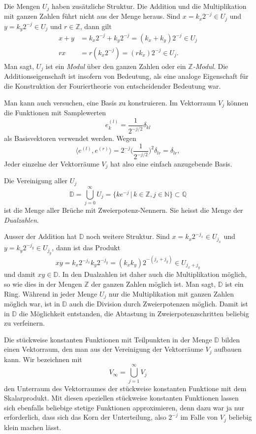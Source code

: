 Die Mengen $U_j$ haben zusätzliche Struktur.
Die Addition und die Multiplikation mit ganzen Zahlen führt nicht aus
der Menge heraus.
Sind $x=k_x2^{-j}\in U_j$ und $y=k_y2^{-j}\in U_j$ und $r\in\mathbb Z$,
dann gilt
\begin{align*}
x+y &= k_x 2^{-j}+k_y2^{-j}=(k_x+k_y)2^{-j}\in U_j
\\
rx&=r(k_x2^{-j}) = (rk_x)2^{-j}\in U_j.
\end{align*}
Man sagt, $U_j$ ist ein {\em Modul} über den ganzen Zahlen oder ein
{\em $\mathbb Z$-Modul}.
Die Additionseigenschaft ist insofern von Bedeutung, als eine analoge
Eigenschaft für die Konstruktion der Fouriertheorie von entscheidender
Bedeutung war.

Man kann auch versuchen, eine Basis zu konstruieren.
Im Vektorraum $V_j$ können die Funktionen mit Samplewerten
\[
e^{(l)}_k = \frac{1}{2^{-j/2}}\delta_{kl}
\]
als Basisvektoren verwendet werden.
Wegen
\[
\langle e^{(l)},e^{(r)}\rangle
=
2^{-j}
\biggl(
\frac{1}{2^{-j/2}}
\biggr)^2\delta_{lr}
=
\delta_{lr},
\]
Jeder einzelne der Vektorräume $V_j$ hat also eine einfach anzugebende
Basis.

Die Vereinigung aller $U_j$ 
\[
\mathbb D
=
\bigcup_{j=0}^\infty U_j
=
\{ ke^{-j}\,|\, k\in\mathbb Z, j\in\mathbb N\}
\subset
\mathbb Q
\]
ist die Menge aller Brüche mit Zweierpotenz-Nennern.
Sie heisst die Menge der {\em Dualzahlen}.


Ausser der Addition hat 
$\mathbb D$ noch weitere Struktur.
Sind $x = k_x2^{-j_x}\in U_{j_x}$ und $y=k_y2^{-j_y}\in U_{j_y}$, dann
ist das Produkt
\[
xy = k_x2^{-j_x} k_y2^{-j_y}=(k_xk_y)2^{-(j_x+j_y)}\in U_{j_x+j_y}
\]
und damit $xy\in\mathbb D$.
In den Dualzahlen ist daher auch die Multiplikation möglich, so wie
dies in der Mengen $\mathbb Z$ der ganzen Zahlen möglich ist.
Man sagt, $\mathbb D$ ist ein Ring.
Während in jeder Menge $U_j$ nur die Multiplikation mit ganzen Zahlen
möglich war, ist in $\mathbb D$ auch die Division durch Zweierpotenzen
möglich.
Damit ist in $\mathbb D$ die Möglichkeit entstanden, die Abtastung
in Zweierpotenzschritten beliebig zu verfeinern.

Die stückweise konstanten Funktionen mit Teilpunkten in der Menge
$\mathbb D$ bilden einen Vektorraum, den man aus der Vereinigung
der Vektorräume $V_j$ aufbauen kann.
Wir bezeichnen mit
\[
V_\infty = \bigcup_{j=1}^\infty V_j 
\]
den Unterraum des Vektorraumes der stückweise konstanten Funktione mit
dem Skalarprodukt.
Mit diesen speziellen stückweise konstanten Funktionen lassen sich ebenfalls
beliebige stetige Funktionen approximieren, denn dazu war ja nur 
erforderlich, dass sich das Korn der Unterteilung, also $2^{-j}$ im Falle
von $V_j$ beliebig klein machen lässt.

